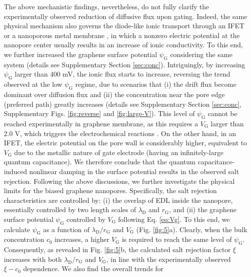 \documentclass[journal=langd5,email=true, hyperref=true, keywords=false]{achemso}
\begin{document}
The above mechanistic findings, nevertheless, do not fully clarify the
experimentally observed reduction of diffusive flux upon
gating. Indeed, the same physical mechanism also governs 
the 
{ diode-like ionic
transport through an IFET  \cite{Nam_2009,Lee_2015,Feng_2016}
or a nanoporous metal membrane \cite{mccurry2017electrolyte}},
in which a nonzero electric potential at
the nanopore center usually results in an increase of ionic
conductivity. To this end, we
further increased the graphene surface potential $\psi_{\mathrm{G}}$
considering the same system (details see Supplementary Section
\ref{sec:conc}). Intriguingly, by increasing
$\psi_{\mathrm{G}}$ larger than 400 mV, the ionic flux starts to
increase, reversing the trend observed at the low $\psi_{\mathrm{G}}$
regime, due to scenarios that (i) the drift flux become dominant over diffusion flux
and (ii) the concentration near the pore edge (preferred path) greatly
increases (details see Supplementary Section \ref{sec:conc},
Supplementary Figs. \ref{fig:reverse} and
\ref{fig:large-V}). This level of $\psi_{\mathrm{G}}$ cannot be
reached experimentally in graphene membrane, as this requires a
$V_{\mathrm{G}}$ larger than 2.0 V, which triggers the electrochemical
reactions \cite{Toh_2011}. On the other hand, in an IFET, the electric
potential on the pore wall is considerably higher, equivalent to
$V_{\mathrm{G}}$ due to the metallic nature of gate electrode (having
an infinitely-large quantum capacitance). We therefore conclude that
the quantum capacitance-induced nonlinear damping in the surface
potential results in the observed salt rejection.  Following the above
discussions, we further investigate the physical limits for the biased
graphene nanopores. Specifically, the salt rejection characteristics
are controlled by: (i) the overlap of EDL inside the nanopore,
essentially controlled by two length scales of $\lambda_{\mathrm{D}}$
and $r_{\mathrm{G}}$, and (ii) the graphene surface potential
$\psi_{\mathrm{G}}$ controlled by $V_{\mathrm{G}}$ following
Eq. \eqref{eq:Vg}. To this end, we calculate $\psi_{\mathrm{G}}$ as a
function of $\lambda_{\mathrm{D}} / r_{\mathrm{G}}$ and
$V_{\mathrm{G}}$ (Fig. \ref{fig:5}a). Clearly, when the bulk
concentration $c_{0}$ increases, a higher $V_{\mathrm{G}}$ is required
to reach the same level of $\psi_{\mathrm{G}}$. Consequently, as
revealed in Fig. \ref{fig:5}b, the calculated salt rejection factor
$\xi$ increases with both $\lambda_{\mathrm{D}} / r_{\mathrm{G}}$ and
$V_{\mathrm{G}}$, in line with the experimentally observed
$\xi - c_{0}$ dependence. We also find the overall trends for
\end{document}
